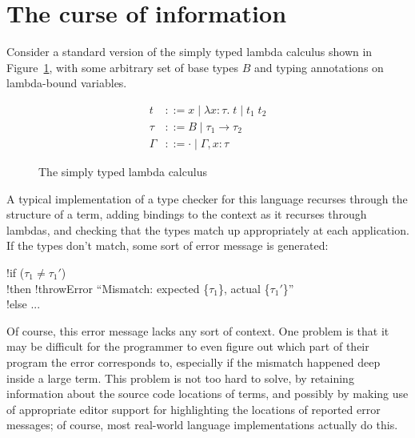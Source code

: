 \documentclass[sigplan, screen]{acmart}\settopmatter{printccs=false,printacmref=false}
\begin{document}
\section{The curse of information}

Consider a standard version of the simply typed lambda calculus shown
in Figure~\ref{fig:STLC}, with
some arbitrary set of base types $B$ and typing annotations on
lambda-bound variables.

\newcommand{\lam}[3]{\lambda {#1}\!:\!{#2}.\; {#3}}
\newcommand{\app}[2]{{#1}\; {#2}}

\newcommand{\ty}[3]{{#1} \vdash {#2} : {#3}}
\newcommand{\nty}[3]{{#1} \nvdash {#2} : {#3}}

\begin{figure}[h!]
\begin{align*}
  t &::= x \mid \lam x \tau t \mid \app{t_1}{t_2} \\
  \tau &::= B \mid \tau_1 \to \tau_2 \\
  \Gamma &::= \cdot \mid \Gamma,x:\tau
\end{align*}

\caption{The simply typed lambda calculus} \label{fig:STLC}
\end{figure}

A typical implementation of a type checker for this language recurses
through the structure of a term, adding bindings to the context as it
recurses through lambdas, and checking that the types match up
appropriately at each application.  If the types don't match, some
sort of error message is generated: \medskip

\begin{acode}
  \> !if ($\tau_1 \neq \tau_1'$) \\
  \> \tb \> !then \> !throwError ``Mismatch: expected \{$\tau_1$\}, actual \{$\tau_1'$\}'' \\
  \> !else \> ...
\end{acode} \medskip

Of course, this error message lacks any sort of context.  One problem
is that it may be difficult for the programmer to even figure out
which part of their program the error corresponds to, especially if
the mismatch happened deep inside a large term. This problem is not
too hard to solve, by retaining information about the source code
locations of terms, and possibly by making use of appropriate editor
support for highlighting the locations of reported error messages; of
course, most real-world language implementations actually do this.
\end{document}
